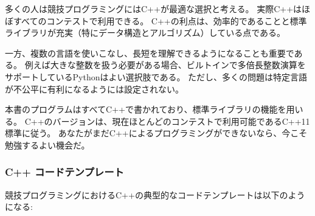 多くの人は競技プログラミングにはC++が最適な選択と考える。
実際C++はほぼすべてのコンテストで利用できる。
C++の利点は、効率的であることと標準ライブラリが充実（特にデータ構造とアルゴリズム）している点である。

\begin{comment}
On the other hand, it is good to
master several languages and understand
their strengths.
For example, if large integers are needed
in the problem,
Python can be a good choice, because it
contains built-in operations for
calculating with large integers.
Still, most problems in programming contests
are set so that
using a specific programming language
is not an unfair advantage.
\end{comment}

一方、複数の言語を使いこなし、長短を理解できるようになることも重要である。
例えば大きな整数を扱う必要がある場合、ビルトインで多倍長整数演算をサポートしているPythonはよい選択肢である。
ただし、多くの問題は特定言語が不公平に有利になるようには設定されない。


\begin{comment}
All example programs in this book are written in C++,
and the standard library's
data structures and algorithms are often used.
The programs follow the C++11 standard,
which can be used in most contests nowadays.
If you cannot program in C++ yet,
now is a good time to start learning.
\end{comment}

本書のプログラムはすべてC++で書かれており、標準ライブラリの機能を用いる。
C++のバージョンは、現在ほとんどのコンテストで利用可能であるC++11標準に従う。
あなたがまだC++によるプログラミングができないなら、今こそ勉強するよい機会だ。

\begin{comment}
\subsubsection{C++ code template}
\end{comment}

\subsubsection{C++ コードテンプレート}

\begin{comment}
A typical C++ code template for competitive programming
looks like this:
\end{comment}

競技プログラミングにおけるC++の典型的なコードテンプレートは以下のようになる:

